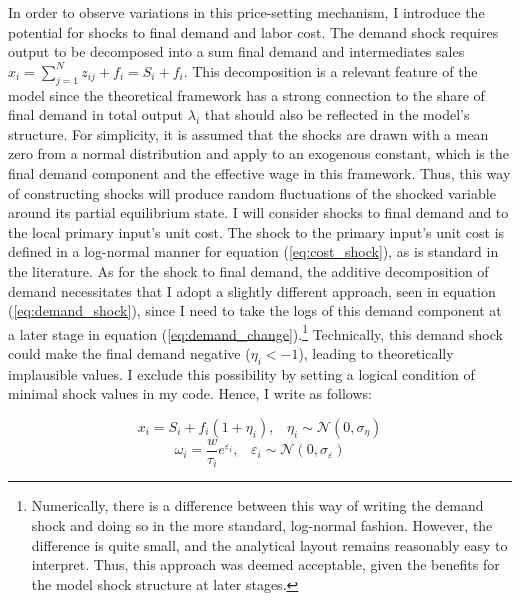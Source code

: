 In order to observe variations in this price-setting mechanism, I introduce the potential for shocks to final demand and labor cost. 
The demand shock requires output to be decomposed into a sum final demand and intermediates sales $x_i = \sum_{j=1}^N z_{ij} + f_i = S_i + f_i$. 
This decomposition is a relevant feature of the model since the theoretical framework has a strong connection to the share of final demand 
in total output $\lambda_i$ that should also be reflected in the model's structure. For simplicity, it is assumed that the shocks are drawn 
with a mean zero from a normal distribution and apply to an exogenous constant, which is the final demand component and the effective wage 
in this framework. Thus, this way of constructing shocks will produce random fluctuations of the shocked variable around its partial 
equilibrium state. I will consider shocks to final demand and to the local primary input's unit cost. The shock to the primary input's 
unit cost is defined in a log-normal manner for equation (\ref{eq:cost_shock}), as is standard in the literature. As for the shock to final
demand, the additive decomposition of demand necessitates that I adopt a slightly different approach, seen in 
equation (\ref{eq:demand_shock}), since I need to take the logs of this demand component at a later stage in equation 
(\ref{eq:demand_change}).\footnote{Numerically, there is a difference between this way of writing the demand shock and doing so in the more 
standard, log-normal fashion. However, the difference is quite small, and the analytical layout remains reasonably easy to interpret. Thus, 
this approach was deemed acceptable, given the benefits for the model shock structure at later stages.} Technically, this demand shock could 
make the final demand negative ($\eta_i < -1$), leading to theoretically implausible values. I exclude this possibility by setting a logical 
condition of minimal shock values in my code. Hence, I write as follows:

\begin{equation} \label{eq:demand_shock}
    x_i = S_i + f_i (1+\eta_i),  \hspace{10pt} \eta_i \sim \mathcal{N}(0,\sigma_{\eta})
\end{equation}
\begin{equation} \label{eq:cost_shock}
    \omega_i =  \frac{w}{\tau_i} e^{\varepsilon_i}, \hspace{10pt} \varepsilon_i \sim \mathcal{N}(0,\sigma_{\varepsilon})
\end{equation}

